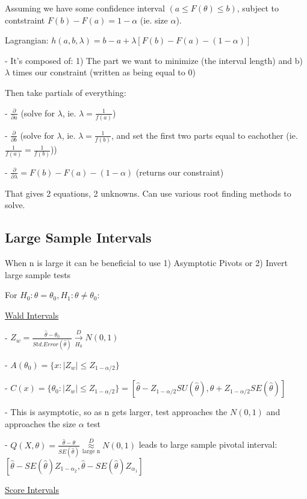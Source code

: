\documentclass{article}
\newcommand{\dto}{\overset{D}{\to}}
\begin{document}
Assuming we have some confidence interval $(a \le F(\theta) \le b)$, subject to contstraint $F(b) - F(a) = 1-\alpha$ (ie. size $\alpha$). 

Lagrangian: $h(a, b, \lambda) = b - a + \lambda[F(b) - F(a) - (1-\alpha)]$

- It's composed of: 1) The part we want to minimize (the interval length) and b) $\lambda$ times our constraint (written as being equal to 0)

Then take partials of everything: 

- $\frac{\partial}{\partial a}$ (solve for $\lambda$, ie. $\lambda = \frac{1}{f(a)}$)

- $\frac{\partial}{\partial b}$ (solve for $\lambda$, ie. $\lambda = \frac{1}{f(b)}$, and set the first two parts equal to eachother (ie. $\frac{1}{f(a)} = \frac{1}{f(b)}$))

- $\frac{\partial}{\partial \lambda} = F(b) - F(a) - (1-\alpha)$ (returns our constraint)

That gives 2 equations, 2 unknowns. Can use various root finding methods to solve. 

\subsection{Large Sample Intervals}

When n is large it can be beneficial to use 1) Asymptotic Pivots or 2) Invert large sample tests

For $H_0: \theta = \theta_0, H_1: \theta \neq \theta_0$:

\underline{Wald Intervals}

- $Z_w  = \frac{\hat{\theta} - \theta_0}{Std.Error(\hat{\theta})} \underset{H_0}{\dto} N(0,1)$

- $A(\theta_0) = \{x: |Z_w| \le Z_{1-\alpha/2}\}$

- $C(x) = \{\theta_0: |Z_w| \le Z_{1-\alpha/2}\} = [\hat{\theta} - Z_{1-\alpha/2}SU(\hat{\theta}), \hat{\theta} + Z_{1-\alpha/2}SE(\hat{\theta})]$

- This is asymptotic, so as n gets larger, test approaches the $N(0,1)$ and approaches the size $\alpha$ test

- $Q(X,\theta) = \frac{\hat{\theta} - \theta}{SE(\hat{\theta})} \underset{\text{large n}}{\overset{D}{\approx}} N(0,1)$ leads to large sample pivotal interval: $[\hat{\theta} - SE(\hat{\theta})Z_{1-\alpha_2}, \hat{\theta} - SE(\hat{\theta})Z_{\alpha_1}]$

\underline{Score Intervals}
\end{document}
